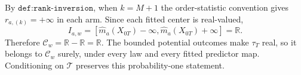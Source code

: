 By \(\texttt{def:rank-inversion}\), when \(k=M+1\) the order-statistic convention gives \(r_{a,(k)}=+\infty\) in each arm. Since each fitted center is real-valued, \[I_{a,w}=[\widehat m_a(X_{0T})-\infty,\widehat m_a(X_{0T})+\infty]=\mathbb R.\] Therefore \(\mathcal C_w=\mathbb R-\mathbb R=\mathbb R\). The bounded potential outcomes make \(\tau_T\) real, so it belongs to \(\mathcal C_w\) surely, under every law and every fitted predictor map. Conditioning on \(\mathcal T\) preserves this probability-one statement.
